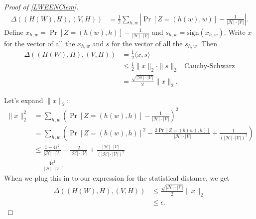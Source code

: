 \begin{proof}[Proof of \cref{LWEENClem}]
\begin{equation*}
 \begin{aligned} \Delta((H(W),H),(V,H))&=\frac{1}{2}\sum_{h,w}\left|\Pr[Z=(h(w),w)]-\frac{1}{|\mathcal{H}|\cdot|\mathcal{V}|}\right|.\end{aligned} 
\end{equation*}
Define
\(x_{h,w}=\Pr[Z=(h(w),h)]-\frac{1}{|\mathcal{H}|\cdot|\mathcal{V}|}\)
and \(s_{h,w}=\text{sign}(x_{h,w})\). Write \(x\) for the vector of all
the \(x_{h,w}\) and \(s\) for the vector of all the \(s_{h,w}\). Then
\begin{equation*}
\begin{aligned}\Delta((H(W),H),(V,H))&=\frac{1}{2}\langle x,s\rangle\\&\le\frac{1}{2}\|x\|_2\cdot\|s\|_2&\text{Cauchy-Schwarz}\\
&=\frac{\sqrt{|\mathcal{H}|\cdot|\mathcal{V}|}}{2}\|x\|_2.\end{aligned}
\end{equation*}

Let's expand \(\|x\|_2\):
\begin{equation*}
\begin{aligned} \|x\|_2^2&=\sum_{h,w}\left(\Pr[Z=(h(w),h)]-\frac{1}{|\mathcal{H}|\cdot|\mathcal{V}|}\right)^2\\&=\sum_{h,w}\left(\Pr[Z=(h(w),h)]^2-\frac{2\Pr[Z=(h(w),h)]}{|\mathcal{H}|\cdot|\mathcal{V}|}+\frac{1}{(|\mathcal{H}|\cdot|\mathcal{V}|)^2}\right)\\&\le\frac{1+4\epsilon^2}{|\mathcal{H}|\cdot|\mathcal{V}|}-\frac{2}{|\mathcal{H}|\cdot|\mathcal{V}|}+\frac{|\mathcal{H}|\cdot|\mathcal{V}|}{(|\mathcal{H}|\cdot|\mathcal{V}|)^2}\\&=\frac{4\epsilon^2}{|\mathcal{H}|\cdot|\mathcal{V}|}.\end{aligned}
\end{equation*}
When we plug this in to our expression for the statistical distance, we
get
\begin{equation*}
\begin{aligned}\Delta((H(W),H),(V,H))&\le\frac{\sqrt{|\mathcal{H}|\cdot|\mathcal{V}|}}{2}\|x\|_2\\&\le \epsilon.\end{aligned}
\end{equation*}

\end{proof}


